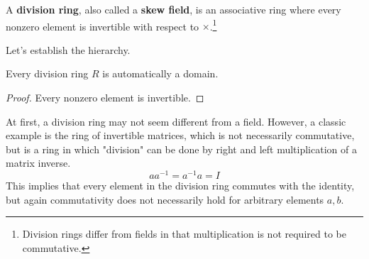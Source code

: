   \begin{definition}
    A \textbf{division ring}, also called a \textbf{skew field}, is an associative ring where every nonzero element is invertible with respect to $\times$.\footnote{Division rings differ from fields in that multiplication is not required to be commutative. }
  \end{definition}

  Let's establish the hierarchy. 

  \begin{lemma}
    Every division ring $R$ is automatically a domain. 
  \end{lemma}
  \begin{proof}
    Every nonzero element is invertible. 
  \end{proof}

  \begin{example}
    At first, a division ring may not seem different from a field. However, a classic example is the ring of invertible matrices, which is not necessarily commutative, but is a ring in which "division" can be done by right and left multiplication of a matrix inverse. 
    \begin{equation}
      a a^{-1} = a^{-1} a = I
    \end{equation}
    This implies that every element in the division ring commutes with the identity, but again commutativity does not necessarily hold for arbitrary elements $a, b$. 
  \end{example} 


